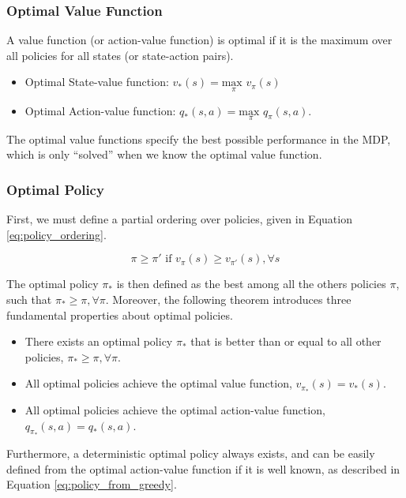 \subsubsection{Optimal Value Function}

A value function (or action-value function) is optimal if it is the maximum over all policies for all states (or state-action pairs).
\begin{itemize}
\item
	Optimal State-value function: $v_*(s) = \underset{\pi}{\textrm{max }} v_\pi(s)$
\item
	Optimal Action-value function: $q_*(s, a) = \underset{\pi}{\textrm{max }} q_\pi(s, a)$.
\end{itemize}

The optimal value functions specify the best possible performance in the MDP, which is only ``solved'' when we know the optimal value function.

\subsubsection{Optimal Policy}

First, we must define a partial ordering over policies, given in Equation \eqref{eq:policy_ordering}.

\begin{equation}
\pi \geq \pi' \text{ if } v_{\pi}(s) \geq v_{\pi'}(s), \forall s
\label{eq:policy_ordering}
\end{equation}

The optimal policy $\pi_*$ is then defined as the best among all the others policies $\pi$, such that $\pi_* \geq \pi, \forall \pi$. Moreover, the following theorem introduces three fundamental properties about optimal policies.

\begin{itemize}
\item
There exists an optimal policy $\pi_*$ that is better than or equal to all other policies, $\pi_* \geq \pi, \forall \pi$.
\item
All optimal policies achieve the optimal value function, $v_{\pi_*}(s) = v_*(s)$.
\item
All optimal policies achieve the optimal action-value function, $q_{\pi_*}(s,a) = q_*(s,a)$.
\end{itemize}

Furthermore, a deterministic optimal policy always exists, and can be easily defined from the optimal action-value function if it is well known, as described in Equation \eqref{eq:policy_from_greedy}.

